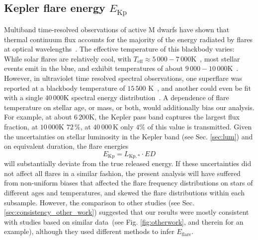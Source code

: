 \documentclass{aa}
\begin{document}
\subsection{Kepler flare energy $E_\mathrm{Kp}$}
\label{sec:en}
Multiband time-resolved observations of active M dwarfs have shown that thermal continuum flux accounts for the majority  of the energy radiated by flares at optical wavelengths~\citep{kowalski2013}. %
The effective temperature of this blackbody varies:
While solar flares are relatively cool, with \mbox{$T_\mathrm{eff}\approx5\,000-7\,000 $\;K}~\citep{kleint_solarstellarwlf_2016, kerr_solarstellarwlf_2014, watanabe_solarstellarwlf_2013, namekata_solarstellarwlf_2017}, most stellar events emit in the blue, and exhibit temperatures of about $9\,000-10\,000$\;K~\citep{1992ApJS...78..565H, kretzschmar_sun_2011, davenport_multi-wavelength_2012, shibayama2013}. However, in ultraviolet time resolved spectral observations, one superflare was reported at a blackbody temperature of $15\,500$ K~\citep{loyd2018}, and another could even be fit with a single $40\,000$\;K spectral energy distribution~\citep{froning_40000_2019}.
A dependence of flare temperature on stellar age, or mass, or both, would additionally bias our analysis. For example, at about $6\,200$\;K, the Kepler pass band captures the largest flux fraction, at $10\,000$\;K $72\,\%$, at $40\,000$\,K only $4\%$ of this value is transmitted. 
Given the uncertainties on stellar luminosity in the Kepler band (see Sec. \ref{sec:lum}) and on equivalent duration, the flare energies
\begin{equation}
E_\mathrm{Kp} = L_\mathrm{Kp,*} \cdot ED
\end{equation}  
will substantially deviate from the true released energy. If these uncertainties did not affect all flares in a similar fashion, the present analysis will have suffered from non-uniform biases that affected the flare frequency distributions on stars of different ages and temperatures, and skewed the flare distributions within each subsample. However, the comparison to other studies (see Sec. \ref{sec:consistency_other_work}) suggested that our results were mostly consistent with studies based on similar data~(see Fig. \ref{fig:otherwork}, and \citealt{lin2019} therein for an example), although they used different methods to infer $E_\mathrm{flare}$.  
\end{document}
